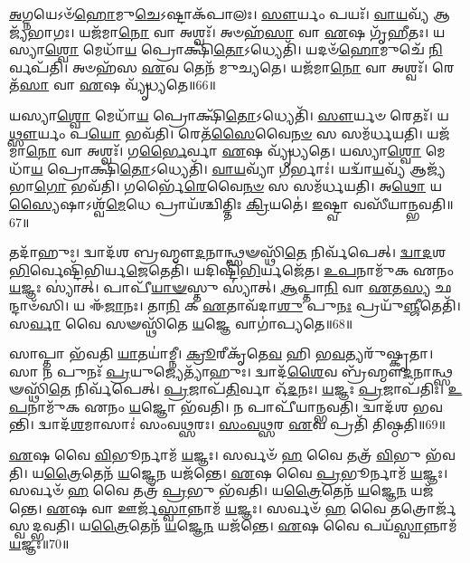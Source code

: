 \-\ul{𑌅}\-𑌗𑍍𑌨𑌯𑍇\-𑌽𑍞᳴\-\ul{𑌹𑍋}\-𑌮𑍁\-\ul{𑌚𑍇}\-\-𑌽𑌷𑍍𑌟𑌾\-𑌕᳴𑌪𑌾𑌲𑌃।
\-\ul{𑌸𑍗}\-𑌰𑍍𑌯𑌂 𑌪𑌯𑌃᳴।
\-\ul{𑌵𑌾}\-\-\ul{𑌯}\-𑌵𑍍𑌯᳴ 𑌆𑌜𑍍𑌯᳴𑌭𑌾𑌗𑌃।
𑌯𑌜᳴𑌮𑌾\-\ul{𑌨𑍋} 𑌵𑌾 𑌅𑌶𑍍𑌵𑌃᳴।
𑌅𑍞𑌹᳴\-\ul{𑌸𑌾} 𑌵𑌾 \ul{𑌏}\-𑌷 𑌗𑍃᳴\-\ul{𑌹𑍀}\-𑌤𑌃।
𑌯𑌸𑍍𑌯𑌾\-\ul{𑌶𑍍𑌵𑍋} 𑌮𑍇𑌧𑌾᳴\-\ul{𑌯} 𑌪𑍍𑌰𑍋𑌕𑍍𑌷𑌿᳴\-\ul{𑌤𑍋}\-\-𑌽𑌧𑍍𑌯𑍇𑌤𑌿᳴।
𑌯𑌦𑍞᳴\-\ul{𑌹𑍋}\-𑌮𑍁𑌚𑍇᳴ \ul{𑌨𑌿}\-𑌰𑍍𑌵𑌪᳴𑌤𑌿।
𑌅𑍞𑌹᳴𑌸 \ul{𑌏}\-𑌵 𑌤𑍇𑌨᳴ 𑌮𑍁𑌚𑍍𑌯𑌤𑍇।
𑌯𑌜᳴𑌮𑌾\-\ul{𑌨𑍋} 𑌵𑌾 𑌅𑌶𑍍𑌵𑌃᳴।
𑌰𑍇𑌤᳴\-\ul{𑌸𑌾} 𑌵𑌾 \ul{𑌏}\-𑌷 𑌵𑍍𑌯𑍃᳴𑌧𑍍𑌯𑌤𑍇॥66॥

𑌯𑌸𑍍𑌯𑌾\-\ul{𑌶𑍍𑌵𑍋} 𑌮𑍇𑌧𑌾᳴\-\ul{𑌯} 𑌪𑍍𑌰𑍋𑌕𑍍𑌷𑌿᳴\-\ul{𑌤𑍋}\-\-𑌽𑌧𑍍𑌯𑍇𑌤𑌿᳴।
\-\ul{𑌸𑍗}\-𑌰𑍍𑌯𑍞 𑌰𑍇𑌤𑌃᳴।
𑌯\-\ul{𑌥𑍍𑌸𑍗}\-𑌰𑍍𑌯𑌂 𑌪\-\ul{𑌯𑍋} 𑌭𑌵᳴𑌤𑌿।
𑌰𑍇𑌤᳴\-\ul{𑌸𑍈}\-𑌵𑍈\-\ul{𑌨}\-\-\ul{𑍞} 𑌸 𑌸𑌮᳴𑌰𑍍𑌧𑌯𑌤𑌿।
𑌯𑌜᳴𑌮𑌾\-\ul{𑌨𑍋} 𑌵𑌾 𑌅𑌶𑍍𑌵𑌃᳴।
𑌗\-\ul{𑌰𑍍𑌭𑍈}\-𑌰𑍍𑌵𑌾 \ul{𑌏}\-𑌷 𑌵𑍍𑌯𑍃᳴𑌧𑍍𑌯𑌤𑍇।
𑌯𑌸𑍍𑌯𑌾\-\ul{𑌶𑍍𑌵𑍋} 𑌮𑍇𑌧𑌾᳴\-\ul{𑌯} 𑌪𑍍𑌰𑍋𑌕𑍍𑌷𑌿᳴\-\ul{𑌤𑍋}\-\-𑌽𑌧𑍍𑌯𑍇𑌤𑌿᳴।
\-\ul{𑌵𑌾}\-\-\ul{𑌯}\-𑌵𑍍𑌯𑌾᳴ 𑌗𑌰𑍍𑌭𑌾𑌃॑।
𑌯𑌦𑍍𑌵𑌾᳴\-\ul{𑌯}\-𑌵𑍍𑌯᳴ 𑌆𑌜𑍍𑌯᳴𑌭𑌾\-\ul{𑌗𑍋} 𑌭𑌵᳴𑌤𑌿।
𑌗𑌰𑍍𑌭𑍈᳴\-\ul{𑌰𑍇}\-𑌵𑍈\-\ul{𑌨}\-\-\ul{𑍞} 𑌸 𑌸𑌮᳴𑌰𑍍𑌧𑌯𑌤𑌿।
𑌅\-\ul{𑌥𑍋} 𑌯\-\ul{𑌸𑍍𑌯𑍈}\-𑌷𑌾\-𑌽𑌶𑍍𑌵᳴\-\ul{𑌮𑍇}\-𑌧𑍇 𑌪𑍍𑌰𑌾𑌯᳴𑌶𑍍𑌚𑌿𑌤𑍍𑌤𑌿𑌃 \ul{𑌕𑍍𑌰𑌿}\-𑌯𑌤𑍇॑।
\-\ul{𑌇}\-𑌷𑍍𑌟𑍍𑌵𑌾 𑌵𑌸𑍀᳴𑌯𑌾𑌨𑍍𑌭𑌵𑌤𑌿॥67॥\anuvakamend[\-\ul{𑌵𑌿}\-𑌨𑍍𑌦𑌤𑍍𑌯𑌶𑍍𑌲𑍋᳴𑌣𑍋 \ul{𑌹𑍈}\-𑌵 𑌭᳴𑌵𑌤𑍍𑌯\-\ul{𑌧𑍀}\-𑌯𑌾𑌦𑍃᳴𑌧𑍍𑌯\-\ul{𑌤𑍇} 𑌗𑌰𑍍𑌭𑍈᳴\-\ul{𑌰𑍇}\-𑌵𑍈\-\ul{𑌨}\-\-\ul{𑍞} 𑌸 𑌸𑌮᳴𑌰𑍍𑌧𑌯\-\ul{𑌤𑌿} 𑌦𑍍𑌵𑍇 𑌚᳴]

𑌤𑌦𑌾᳴𑌹𑍁𑌃।
𑌦𑍍𑌵𑌾𑌦᳴𑌶 𑌬𑍍𑌰𑌹𑍍𑌮𑍗\-\ul{𑌦}\-𑌨𑌾𑌨𑍍𑌥𑍍𑌸𑍟𑌸𑍍𑌥𑌿᳴\-\ul{𑌤𑍇} 𑌨𑌿𑌰𑍍𑌵᳴𑌪𑍇𑌤𑍍।
\-\ul{𑌦𑍍𑌵𑌾}\-\-\ul{𑌦}\-𑌶\-\ul{𑌭𑌿}\-𑌰𑍍𑌵𑍇𑌷𑍍𑌟𑌿᳴\-𑌭𑌿𑌰𑍍𑌯\-\ul{𑌜𑍇}\-𑌤𑍇𑌤𑌿᳴।
𑌯𑌦𑌿𑌷𑍍𑌟𑌿᳴\-\ul{𑌭𑌿}\-𑌰𑍍𑌯𑌜𑍇᳴𑌤।
\-\ul{𑌉}\-\-\ul{𑌪}\-𑌨𑌾𑌮𑍁᳴𑌕 𑌏𑌨𑌂 \ul{𑌯}\-𑌜𑍍𑌞𑌃 𑌸𑍍𑌯𑌾॑𑌤𑍍।
𑌪𑌾𑌪𑍀᳴\-\ul{𑌯𑌾}\-\-\ul{𑍟}\-𑌸𑍍𑌤𑍁 𑌸𑍍𑌯𑌾॑𑌤𑍍।
\-\ul{𑌆}\-𑌪𑍍𑌤𑌾\-\ul{𑌨𑌿} 𑌵𑌾 \ul{𑌏}\-𑌤\-\ul{𑌸𑍍𑌯} 𑌛𑌨𑍍𑌦𑌾𑍞᳴𑌸𑌿।
𑌯 𑌈᳴\-\ul{𑌜𑌾}\-𑌨𑌃।
𑌤𑌾\-\ul{𑌨𑌿} 𑌕 \ul{𑌏}\-𑌤𑌾𑌵᳴𑌦𑌾\-\ul{𑌶𑍁} 𑌪𑍁\-\ul{𑌨𑌃} 𑌪𑍍𑌰𑌯𑍁᳴\-\ul{𑌞𑍍𑌜𑍀}\-𑌤𑍇𑌤𑌿᳴।
𑌸\-\ul{𑌰𑍍𑌵𑌾} 𑌵𑍈 𑌸𑍟𑌸𑍍𑌥𑌿᳴𑌤𑍇 \ul{𑌯}\-𑌜𑍍𑌞𑍇 𑌵𑌾𑌗𑌾॑𑌪𑍍𑌯𑌤𑍇॥68॥

𑌸𑌾𑌪𑍍𑌤𑌾 𑌭᳴𑌵𑌤𑌿 \ul{𑌯𑌾}\-𑌤𑌯𑌾॑𑌮𑍍𑌨𑍀।
\-\ul{𑌕𑍍𑌰𑍂}\-𑌰𑍀𑌕𑍃᳴𑌤𑍇\-\ul{𑌵} 𑌹𑌿 𑌭\-\ul{𑌵}\-𑌤𑍍𑌯𑌰𑍁᳴𑌷𑍍𑌕𑍃𑌤𑌾।
𑌸𑌾 𑌨 𑌪𑍁𑌨𑌃᳴ \ul{𑌪𑍍𑌰}\-𑌯𑍁𑌜𑍍𑌯𑍇𑌤𑍍𑌯𑌾᳴𑌹𑍁𑌃।
𑌦𑍍𑌵𑌾𑌦᳴\-\ul{𑌶𑍈}\-𑌵 𑌬𑍍𑌰᳴𑌹𑍍𑌮𑍗\-\ul{𑌦}\-𑌨𑌾𑌨𑍍𑌥𑍍𑌸𑍟𑌸𑍍𑌥𑌿᳴\-\ul{𑌤𑍇} 𑌨𑌿𑌰𑍍𑌵᳴𑌪𑍇𑌤𑍍।
\-\ul{𑌪𑍍𑌰}\-𑌜𑌾𑌪᳴\-\ul{𑌤𑌿}\-𑌰𑍍𑌵𑌾 𑌓᳴\-\ul{𑌦}\-𑌨𑌃।
\-\ul{𑌯}\-𑌜𑍍𑌞𑌃 \ul{𑌪𑍍𑌰}\-𑌜𑌾\-𑌪᳴𑌤𑌿𑌃।
\-\ul{𑌉}\-\-\ul{𑌪}\-𑌨𑌾𑌮𑍁᳴𑌕 𑌏𑌨𑌂 \ul{𑌯}\-𑌜𑍍𑌞𑍋 𑌭᳴𑌵𑌤𑌿।
𑌨 𑌪𑌾𑌪𑍀᳴𑌯𑌾𑌨𑍍𑌭𑌵𑌤𑌿।
𑌦𑍍𑌵𑌾𑌦᳴𑌶 𑌭𑌵𑌨𑍍𑌤𑌿।
𑌦𑍍𑌵𑌾𑌦᳴\-\ul{𑌶}\-𑌮𑌾𑌸𑌾𑌃॑ 𑌸𑌂𑌵\-\ul{𑌥𑍍𑌸}\-𑌰𑌃।
\-\ul{𑌸𑌂}\-\-\ul{𑌵}\-\-\ul{𑌥𑍍𑌸}\-𑌰 \ul{𑌏}\-𑌵 𑌪𑍍𑌰𑌤𑌿᳴ 𑌤𑌿𑌷𑍍𑌠𑌤𑌿॥69॥\anuvakamend[\-\ul{𑌆}\-\-\ul{𑌪𑍍𑌯}\-\-\ul{𑌤𑍇} \ul{𑌸𑌂}\-\-\ul{𑌵}\-\-\ul{𑌥𑍍𑌸}\-𑌰 𑌏𑌕𑌂᳴ 𑌚]

\-\ul{𑌏}\-𑌷 𑌵𑍈 \ul{𑌵𑌿}\-𑌭𑍂𑌰𑍍𑌨𑌾𑌮᳴ \ul{𑌯}\-𑌜𑍍𑌞𑌃।
𑌸𑌰𑍍𑌵𑍞᳴ \ul{𑌹} 𑌵𑍈 𑌤𑌤𑍍𑌰᳴ \ul{𑌵𑌿}\-𑌭𑍁 𑌭᳴𑌵𑌤𑌿।
𑌯\-\ul{𑌤𑍍𑌰𑍈}\-𑌤𑍇𑌨᳴ \ul{𑌯}\-𑌜𑍍𑌞𑍇\-\ul{𑌨} 𑌯𑌜᳴𑌨𑍍𑌤𑍇।
\-\ul{𑌏}\-𑌷 𑌵𑍈 \ul{𑌪𑍍𑌰}\-𑌭𑍂𑌰𑍍𑌨𑌾𑌮᳴ \ul{𑌯}\-𑌜𑍍𑌞𑌃।
𑌸𑌰𑍍𑌵𑍞᳴ \ul{𑌹} 𑌵𑍈 𑌤𑌤𑍍𑌰᳴ \ul{𑌪𑍍𑌰}\-𑌭𑍁 𑌭᳴𑌵𑌤𑌿।
𑌯\-\ul{𑌤𑍍𑌰𑍈}\-𑌤𑍇𑌨᳴ \ul{𑌯}\-𑌜𑍍𑌞𑍇\-\ul{𑌨} 𑌯𑌜᳴𑌨𑍍𑌤𑍇।
\-\ul{𑌏}\-𑌷 𑌵𑌾 𑌊𑌰𑍍𑌜᳴\-\ul{𑌸𑍍𑌵𑌾}\-𑌨𑍍𑌨𑌾𑌮᳴ \ul{𑌯}\-𑌜𑍍𑌞𑌃।
𑌸𑌰𑍍𑌵𑍞᳴ \ul{𑌹} 𑌵𑍈 𑌤𑌤𑍍𑌰𑍋𑌰𑍍𑌜᳴𑌸𑍍𑌵𑌦𑍍𑌭𑌵𑌤𑌿।
𑌯\-\ul{𑌤𑍍𑌰𑍈}\-𑌤𑍇𑌨᳴ \ul{𑌯}\-𑌜𑍍𑌞𑍇\-\ul{𑌨} 𑌯𑌜᳴𑌨𑍍𑌤𑍇।
\-\ul{𑌏}\-𑌷 𑌵𑍈 𑌪𑌯᳴\-\ul{𑌸𑍍𑌵𑌾}\-𑌨𑍍𑌨𑌾𑌮᳴ \ul{𑌯}\-𑌜𑍍𑌞𑌃॥70॥

